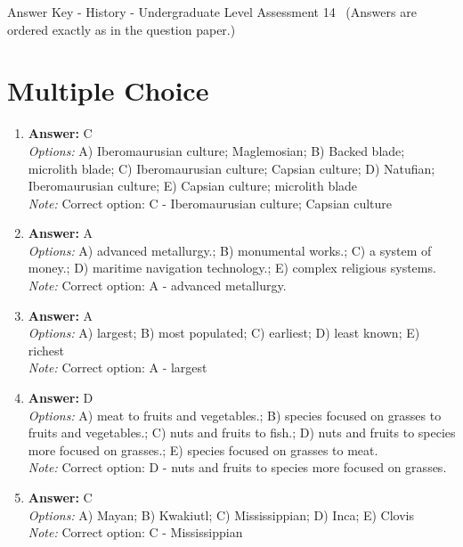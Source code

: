 \documentclass[12pt]{article}
\begin{document}
\begin{center}
Answer Key - History - Undergraduate Level Assessment 14 \
\small (Answers are ordered exactly as in the question paper.)
\end{center}

\section*{Multiple Choice}
\begin{enumerate}[label=\arabic*.]
\item \textbf{Answer:} C
\\ \textit{Options:} A) Iberomaurusian culture; Maglemosian; B) Backed blade; microlith blade; C) Iberomaurusian culture; Capsian culture; D) Natufian; Iberomaurusian culture; E) Capsian culture; microlith blade
\\ \textit{Note:} Correct option: C - Iberomaurusian culture; Capsian culture
\item \textbf{Answer:} A
\\ \textit{Options:} A) advanced metallurgy.; B) monumental works.; C) a system of money.; D) maritime navigation technology.; E) complex religious systems.
\\ \textit{Note:} Correct option: A - advanced metallurgy.
\item \textbf{Answer:} A
\\ \textit{Options:} A) largest; B) most populated; C) earliest; D) least known; E) richest
\\ \textit{Note:} Correct option: A - largest
\item \textbf{Answer:} D
\\ \textit{Options:} A) meat to fruits and vegetables.; B) species focused on grasses to fruits and vegetables.; C) nuts and fruits to fish.; D) nuts and fruits to species more focused on grasses.; E) species focused on grasses to meat.
\\ \textit{Note:} Correct option: D - nuts and fruits to species more focused on grasses.
\item \textbf{Answer:} C
\\ \textit{Options:} A) Mayan; B) Kwakiutl; C) Mississippian; D) Inca; E) Clovis
\\ \textit{Note:} Correct option: C - Mississippian
\end{enumerate}
\end{document}
